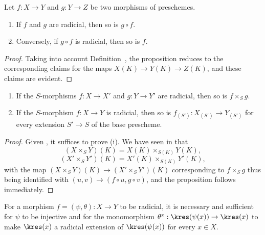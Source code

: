 \begin{proposition}[3.5.6]
\label{I.3.5.6}
Let $f:X\to Y$ and $g:Y\to Z$ be two morphisms of preschemes.
\begin{enumerate}
  \item[{\rm(i)}] If $f$ and $g$ are radicial, then so is $g\circ f$.
  \item[{\rm(ii)}] Conversely, if $g\circ f$ is radicial, then so is $f$.
\end{enumerate}
\end{proposition}

\begin{proof}
Taking into account Definition~, the proposition reduces to the corresponding claims for the maps $X(K)\to Y(K)\to Z(K)$, and these claims are evident.
\end{proof}

\begin{proposition}[3.5.7]
\label{I.3.5.7}
\medskip\noindent
\begin{enumerate}
  \item[{\rm(i)}] If the $S$-morphisms $f:X\to X'$ and $g:Y\to Y'$ are radicial, then so is $f\times_S g$.
  \item[{\rm(ii)}] If the $S$-morphism $f:X\to Y$ is radicial, then so is $f_{(S')}:X_{(S')}\to Y_{(S')}$ for every extension $S'\to S$ of the base prescheme.
\end{enumerate}
\end{proposition}

\begin{proof}
Given , it suffices to prove (i).
We have seen in  that
\[
  (X\times_S Y)(K)=X(K)\times_{S(K)}Y(K),
\]
\[
  (X'\times_S Y')(K)=X'(K)\times_{S(K)}Y'(K),
\]
with the map $(X\times_S Y)(K)\to(X'\times_S Y')(K)$ corresponding to $f\times_S g$ thus being identified with $(u,v)\to(f\circ u,g\circ v)$, and the proposition follows immediately.
\end{proof}

\begin{proposition}[3.5.8]
\label{I.3.5.8}
For a morphism $f=(\psi,\theta):X\to Y$ to be radicial, it is necessary and sufficient for $\psi$ to be injective and for the monomorphism $\theta^x:\kres(\psi(x))\to\kres(x)$ to make $\kres(x)$ a radicial extension of $\kres(\psi(x))$ for every $x\in X$.
\end{proposition}

